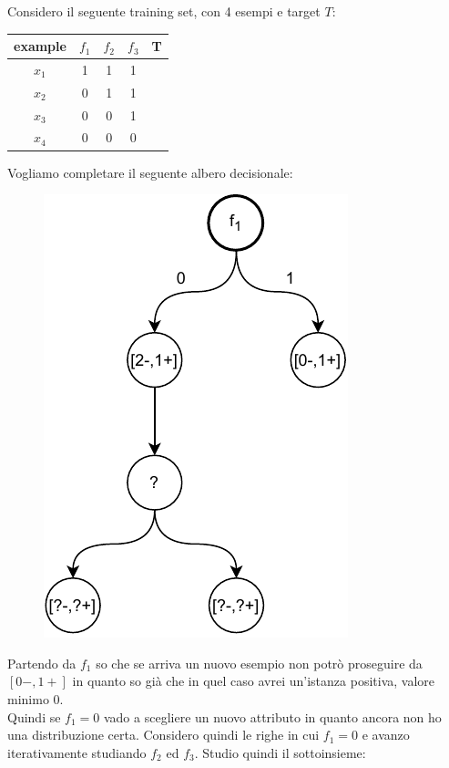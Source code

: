 \begin{esempio}
  Considero il seguente training set, con 4 esempi e target $T$:
  \begin{table}[H]
    \centering
    \begin{tabular}{c|c|c|c|c}
      example & $f_1$ & $f_2$ & $f_3$ & T\\
      \hline
      $x_1$ & 1 & 1 & 1 & \color{darkgreen}{1}\\
      $x_2$ & 0 & 1 & 1 & \color{red}{0}\\
      $x_3$ & 0 & 0 & 1 & \color{darkgreen}{1}\\
      $x_4$ & 0 & 0 & 0 & \color{red}{0}\\
    \end{tabular}
  \end{table}
  Vogliamo completare il seguente albero decisionale:
  \begin{figure}[H]
    \centering
    \includegraphics[scale = 0.75]{img/id5.pdf}
  \end{figure}
  Partendo da $f_1$ so che se arriva un nuovo esempio non potrò proseguire da
  $[0-, 1+]$ in quanto so già che in quel caso avrei un'istanza positiva, valore
  minimo $0$.\\
  Quindi se $f_1=0$ vado a scegliere un nuovo attributo in quanto ancora non ho
  una distribuzione certa. Considero quindi le righe in cui $f_1=0$ e avanzo
  iterativamente studiando $f_2$ ed $f_3$. Studio quindi il sottoinsieme: 

\end{esempio}
